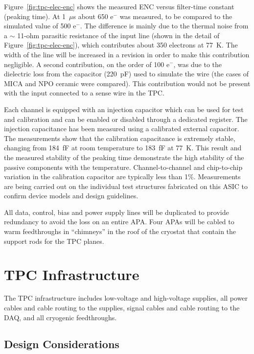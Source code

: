 Figure~\ref{fig:tpc-elec-enc} shows the measured ENC versus filter-time constant (peaking time).
At 1~$\mu$s about 650 e$^{-}$ was measured,
to be compared to the simulated value of 500 e$^{-}$. The difference is
mainly due to the thermal noise from a $\sim$
11-ohm parasitic resistance of the input
line (shown in the detail of Figure~\ref{fig:tpc-elec-enc}), which contributes about 350
electrons at 77~K. The width of the line will be increased in a
revision in order to make this contribution negligible. A second
contribution, on the order of 100 e$^{-}$, was due to the dielectric
loss from the  capacitor (220~pF) used to simulate the wire (the cases of MICA and NPO ceramic were compared). This contribution would not be
present with the input connected to a sense wire in the TPC.

Each channel is equipped with an injection capacitor which can be used
for test and calibration and can be enabled or disabled through a
dedicated register. The injection capacitance has been measured using 
a calibrated external capacitor. The measurements show
that the calibration capacitance is extremely stable, changing from
184~fF at room temperature to 183~fF at 77~K. This result and the measured
stability of the peaking time demonstrate the high stability of the
passive components with the temperature. Channel-to-channel and chip-to-chip
variation in the calibration capacitor are typically less than 1\%. Measurements are being carried
out on the individual test structures fabricated on this ASIC to
confirm device models and design guidelines.

All data, control, bias and power supply lines will be duplicated to
provide redundancy to avoid the loss on an entire APA.  Four APAs will be
cabled to warm feedthroughs in ``chimneys'' in the roof of the cryostat that
contain the support rods for the TPC planes.

\section{TPC Infrastructure}
\label{sec:v5-tpc-feedthru}
   
The TPC infrastructure includes low-voltage and high-voltage supplies, all power cables and cable routing to the supplies, signal cables and cable routing to the DAQ, and all cryogenic feedthroughs.

\subsection{Design Considerations} 
\label{subsec:v5-tpc-feedthru-reqs-n-specs}

